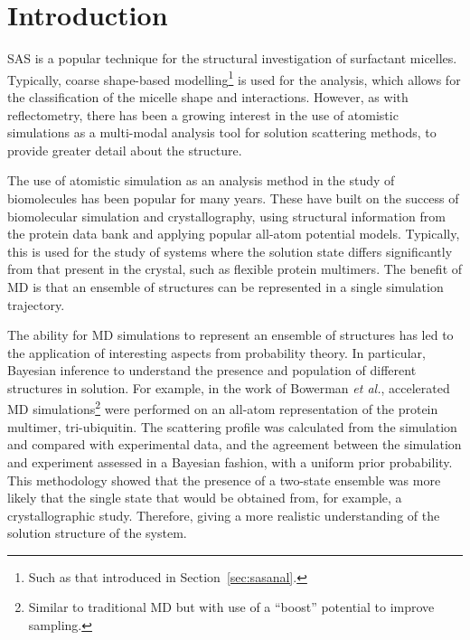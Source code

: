 \section{Introduction}
SAS is a popular technique for the structural investigation of surfactant micelles.\autocite{sanchez-fernandez_micellization_2016}
Typically, coarse shape-based modelling\footnote{Such as that introduced in Section~\ref{sec:sasanal}.} is used for the analysis, which allows for the classification of the micelle shape and interactions.
However, as with reflectometry, there has been a growing interest in the use of atomistic simulations as a multi-modal analysis tool for solution scattering methods,\autocite{ivanovic_temperature-dependent_2018} to provide greater detail about the structure.

The use of atomistic simulation as an analysis method in the study of biomolecules has been popular for many years.\autocite{perkins_solution_1991,mayans_demonstration_1995,hub_interpreting_2018}
These have built on the success of biomolecular simulation and crystallography, using structural information from the protein data bank\autocite{noauthor_rcsb_nodate} and applying popular all-atom potential models.
Typically, this is used for the study of systems where the solution state differs significantly from that present in the crystal, such as flexible protein multimers.
The benefit of MD is that an ensemble of structures can be represented in a single simulation trajectory.\autocite{chen_validating_2014,bowerman_determining_2017}

The ability for MD simulations to represent an ensemble of structures has led to the application of interesting aspects from probability theory.
In particular, Bayesian inference to understand the presence and population of different structures in solution.
For example, in the work of Bowerman \emph{et al.},\autocite{bowerman_determining_2017} accelerated MD simulations\footnote{Similar to traditional MD but with use of a ``boost'' potential to improve sampling.} were performed on an all-atom representation of the protein multimer, tri-ubiquitin.
The scattering profile was calculated from the simulation and compared with experimental data, and the agreement between the simulation and experiment assessed in a Bayesian fashion, with a uniform prior probability.
This methodology showed that the presence of a two-state ensemble was more likely that the single state that would be obtained from, for example, a crystallographic study.
Therefore, giving a more realistic understanding of the solution structure of the system.


